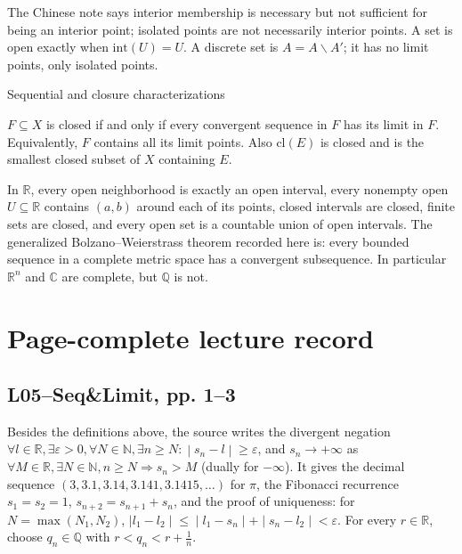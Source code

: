 The Chinese note says interior membership is necessary but not sufficient for being an interior point; isolated points are not necessarily interior points. A set is open exactly when \(\text{int}(U) = U\). A discrete set is \(A = A \smallsetminus A'\); it has no limit points, only isolated points.

\begin{theorem}{Sequential and closure characterizations}

\(F \subseteq X\) is closed if and only if every convergent sequence in \(F\) has its limit in \(F\). Equivalently, \(F\) contains all its limit points. Also \(\text{cl}(E)\) is closed and is the smallest closed subset of \(X\) containing \(E\).

\end{theorem}

In \(\mathbb{R}\), every open neighborhood is exactly an open interval, every nonempty open \(U \subseteq \mathbb{R}\) contains \(\left( {a,b} \right)\) around each of its points, closed intervals are closed, finite sets are closed, and every open set is a countable union of open intervals. The generalized Bolzano--Weierstrass theorem recorded here is: every bounded sequence in a complete metric space has a convergent subsequence. In particular \(\mathbb{R}^{n}\) and \(\mathbb{C}\) are complete, but \(\mathbb{Q}\) is not.

\section{Page-complete lecture record}

\subsection{L05--Seq\&Limit, pp. 1--3}

Besides the definitions above, the source writes the divergent negation \(\left. \forall l \in \mathbb{R},\exists\varepsilon > 0,\forall N \in \mathbb{N},\exists n \geq N: \middle| s_{n} - l \middle| \geq \varepsilon \right.\), and \(s_{n}\rightarrow + \infty\) as \(\forall M \in \mathbb{R},\exists N \in \mathbb{N},n \geq N\Rightarrow s_{n} > M\) (dually for \(- \infty\)). It gives the decimal sequence \(\left( {3,3.1,3.14,3.141,3.1415,\ldots} \right)\) for \(\pi\), the Fibonacci recurrence \(s_{1} = s_{2} = 1\), \(s_{n + 2} = s_{n + 1} + s_{n}\), and the proof of uniqueness: for \(N = \max\left( {N_{1},N_{2}} \right)\), \(\left. |l_{1} - l_{2} \middle| \leq \middle| l_{1} - s_{n} \middle| + \middle| s_{n} - l_{2} \middle| < \varepsilon \right.\). For every \(r \in \mathbb{R}\), choose \(q_{n} \in \mathbb{Q}\) with \(r < q_{n} < r + \frac{1}{n}\).

